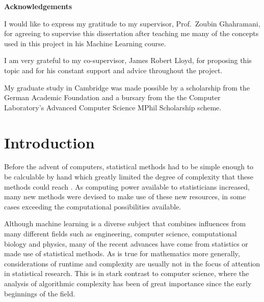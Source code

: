 \documentclass[a4paper,12pt,twoside,openright]{report}
\begin{document}
\pagestyle{empty}
\singlespacing

\onehalfspacing

\singlespacing


\newpage
{\Huge \bf Acknowledgements}
\vspace{24pt} 
\onehalfspacing

I would like to express my gratitude to my supervisor, Prof.\ Zoubin Ghahramani, for agreeing to supervise this dissertation after teaching me many of the concepts used in this project in his Machine Learning course.

I am very grateful to my co-supervisor, James Robert Lloyd, for proposing this topic and for his constant support and advice throughout the project.

My graduate study in Cambridge was made possible by a scholarship from the German Academic Foundation and a bursary from the the Computer Laboratory's Advanced Computer Science MPhil Scholarship scheme.


\singlespacing
\newpage
\vspace*{\fill}


\setcounter{page}{0}
\pagestyle{plain}
\tableofcontents
\listoffigures
\listoftables

\onehalfspacing


\chapter{Introduction}

\setcounter{page}{1}

Before the advent of computers, statistical methods had to be simple enough to be calculable by hand which greatly limited the degree of complexity that these methods could reach \cite{tukey1977exploratory}. As computing power available to statisticians increased, many new methods were devised to make use of these new resources, in some cases exceeding the computational possibilities available.

Although machine learning is a diverse subject that combines influences from many different fields such as engineering, computer science, computational biology and physics, many of the recent advances have come from statistics or made use of statistical methods. As is true for mathematics more generally, considerations of runtime and complexity are usually not in the focus of attention in statistical research. This is in stark contrast to computer science, where the analysis of algorithmic complexity has been of great importance since the early beginnings of the field.
\end{document}
